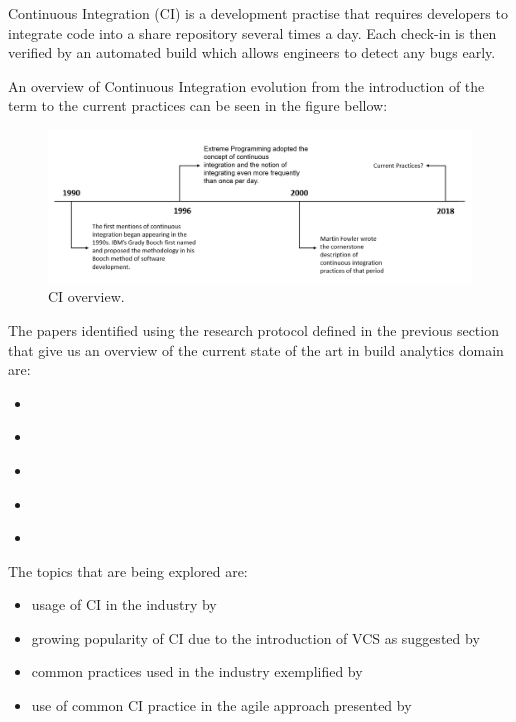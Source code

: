 \documentclass[]{book}
\providecommand{\tightlist}{%
  \setlength{\itemsep}{0pt}\setlength{\parskip}{0pt}}
\begin{document}
Continuous Integration (CI) is a development practise that requires
developers to integrate code into a share repository several times a
day. Each check-in is then verified by an automated build which allows
engineers to detect any bugs early.

An overview of Continuous Integration evolution from the introduction of
the term to the current practices can be seen in the figure bellow:

\begin{figure}
\centering
\includegraphics{figures/build-analytics/state_pr.png}
\caption{CI overview.}
\end{figure}

The papers identified using the research protocol defined in the
previous section that give us an overview of the current state of the
art in build analytics domain are:

\begin{itemize}
\tightlist
\item
  \citet{hilton2016usage}
\item
  \citet{rausch2017empirical}
\item
  \citet{fowler2006continuous}
\item
  \citet{stolberg2009enabling}
\item
  \citet{beller2017travistorrent}
\end{itemize}

The topics that are being explored are:

\begin{itemize}
\tightlist
\item
  usage of CI in the industry by \citet{hilton2016usage}
\item
  growing popularity of CI due to the introduction of VCS as suggested
  by \citet{rausch2017empirical}
\item
  common practices used in the industry exemplified by
  \citet{fowler2006continuous}
\item
  use of common CI practice in the agile approach presented by
  \citet{stolberg2009enabling}
\end{itemize}
\end{document}
